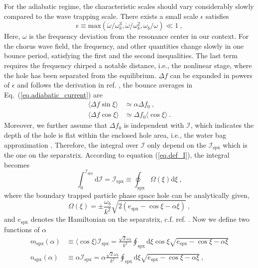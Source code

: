For the adiabatic regime, the characteristic scales should vary considerably slowly compared to the wave trapping scale.
There exists a small scale $\epsilon$ satisfies \cite{berk1999}
\begin{equation}
    \epsilon \equiv \mathrm{max}\left(\ddot{\omega}/\omega_b^3, \dot{\omega}/\omega_b^2, \omega_b/\omega \right) \ll 1~,
\end{equation}
Here, $\omega$ is the frequency deviation from the resonance center in our context.
For the chorus wave field, the frequency, and other quantities change slowly in one bounce period, satisfying the first and the second inequalities. The last term requires the frequency chirped a notable distance, i.e., the nonlinear stage, where the hole has been separated from the equilibrium.
$\Delta f$ can be expanded in powers of $\epsilon$ and follows the derivation in ref. \cite{berk1999}, the bounce averages in Eq.~(\ref{eq.adiabatic_current}) are
\begin{equation}
    \begin{aligned}
    \langle\Delta f \sin \xi \rangle &\simeq \alpha \Delta f_0 ~, \\ 
    \langle \Delta f \cos \xi \rangle &\simeq  \Delta f_0 \langle \cos \xi \rangle ~.
    \end{aligned}
\end{equation}
Moreover, we further assume that $\Delta f_0$ is independent with $\mathcal{I}$, which indicates the depth of the hole is flat within the enclosed hole area, i.e., the water bag approximation \cite{omura_theory_2008,hezaveh2021}. 
Therefore, the integral over $\mathcal{I}$ only depend on the $\mathcal{I}_\mathrm{spx}$ which is the one on the separatrix. 
According to equation (\ref{eq.def_I}), the integral becomes
\begin{equation}
    \int^{\mathcal{I}_\mathrm{s p x}}_0 \mathrm{d}\mathcal{I} = \mathcal{I}_\mathrm{s p x} \equiv \oint_\mathrm{s p x} \Omega (\xi) \mathrm{d} \xi~,
\end{equation}
where the boundary trapped particle phase space hole can be analytically given,
\begin{equation}
    \Omega(\xi) = \pm \frac{\omega_b}{k^2} \sqrt{2 (e_\mathrm{spx}-\cos \xi - \alpha \xi)}~,
\end{equation}
and $e_\mathrm{spx}$ denotes the Hamiltonian on the separatrix, c.f. ref. \cite{zheng2023b}.
Now we define two functions of $\alpha$
\begin{equation}\label{eq.function}
    \begin{aligned}
        m_\mathrm{spx}(\alpha) & \equiv \langle \cos \xi \rangle  \mathcal{I}_\mathrm{spx} = \frac{\sqrt{2} \omega_b}{k^2} \oint_\mathrm{s p x} \mathrm{d} \xi \cos \xi \sqrt{e_\mathrm{s p x}-\cos \xi-\alpha \xi} 
        \\
        n_\mathrm{spx}(\alpha) & \equiv \alpha \mathcal{I}_\mathrm{spx} = \alpha \frac{\sqrt{2} \omega_b}{k^2} \oint_\mathrm{s p x} \mathrm{d} \xi \sqrt{e_\mathrm{s p x}-\cos \xi-\alpha \xi}~,
    \end{aligned}
\end{equation}
